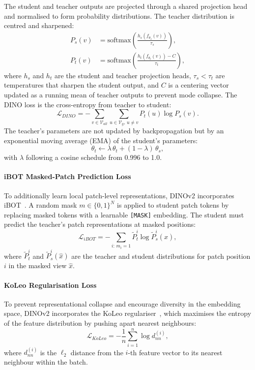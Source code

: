 \documentclass[journal]{IEEEtran}
\begin{document}
The student and teacher outputs are projected through a shared projection head and normalised
to form probability distributions. The teacher distribution is centred and sharpened:
\begin{align}
    P_s(v) &= \text{softmax}\!\left(\tfrac{h_s(f_{\theta_s}(v))}{\tau_s}\right), \\[4pt]
    P_t(v) &= \text{softmax}\!\left(\tfrac{h_t(f_{\theta_t}(v)) - C}{\tau_t}\right),
\end{align}
where $h_s$ and $h_t$ are the student and teacher projection heads, $\tau_s < \tau_t$ are
temperatures that sharpen the student output, and $C$ is a centering vector updated as a
running mean of teacher outputs to prevent mode collapse. The DINO loss is the
cross-entropy from teacher to student:
\begin{equation}
    \mathcal{L}_{DINO} = -\sum_{v \in \mathcal{V}_{all}} \sum_{u \in \mathcal{V}_g,\, u \neq v}
    P_t(u) \log P_s(v).
    \label{eq:dino_loss}
\end{equation}
The teacher's parameters are not updated by backpropagation but by an exponential moving average
(EMA) of the student's parameters:
\begin{equation}
    \theta_t \leftarrow \lambda\,\theta_t + (1 - \lambda)\,\theta_s,
    \label{eq:ema}
\end{equation}
with $\lambda$ following a cosine schedule from 0.996 to 1.0.

\paragraph{iBOT Masked-Patch Prediction Loss}
To additionally learn local patch-level representations, DINOv2 incorporates iBOT~\cite{zhou2022ibot}.
A random mask $m \in \{0,1\}^N$ is applied to student patch tokens by replacing masked tokens
with a learnable \texttt{[MASK]} embedding. The student must predict the teacher's patch
representations at masked positions:
\begin{equation}
    \mathcal{L}_{iBOT} = -\sum_{i:\, m_i=1}
    \tilde{P}_t^i \log \tilde{P}_s^i(\hat{x}),
    \label{eq:ibot_loss}
\end{equation}
where $\tilde{P}_t^i$ and $\tilde{P}_s^i(\hat{x})$ are the teacher and student distributions
for patch position $i$ in the masked view $\hat{x}$.

\paragraph{KoLeo Regularisation Loss}
To prevent representational collapse and encourage diversity in the embedding space, DINOv2
incorporates the KoLeo regulariser~\cite{sablayrolles2019spreading}, which maximises the entropy
of the feature distribution by pushing apart nearest neighbours:
\begin{equation}
    \mathcal{L}_{KoLeo} = -\frac{1}{n}\sum_{i=1}^{n} \log d_{nn}^{(i)},
    \label{eq:koleo}
\end{equation}
where $d_{nn}^{(i)}$ is the $\ell_2$ distance from the $i$-th feature vector to its nearest
neighbour within the batch.
\end{document}
